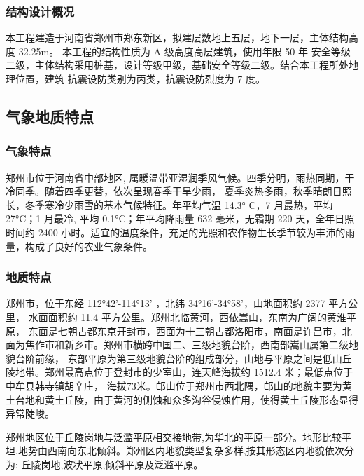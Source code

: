 \subsubsection{结构设计概况}

本工程建造于河南省郑州市郑东新区，拟建层数地上五层，地下一层，主体结构高度 32.25m。
本工程的结构性质为 A 级高度高层建筑，使用年限 50 年
安全等级二级，主体结构采用桩基，设计等级甲级，基础安全等级二级。结合本工程所处地理位置，建筑
抗震设防类别为丙类，抗震设防烈度为 7 度。

\subsection{气象地质特点}
\subsubsection{气象特点}

郑州市位于河南省中部地区, 属暖温带亚湿润季风气候。四季分明，雨热同期，干冷同季。随着四季更替，依次呈现春季干旱少雨，
夏季炎热多雨，秋季晴朗日照长，冬季寒冷少雨雪的基本气候特征。年平均气温 14.3° C，7 月最热，平均 27°C；1 月最冷,
平均 0.1°C；年平均降雨量 632 毫米，无霜期 220 天，全年日照时间约 2400 小时。适宜的温度条件，充足的光照和农作物生长季节较为丰沛的雨量，构成了良好的农业气象条件。

\subsubsection{地质特点}

郑州市，位于东经 112°42'-114°13' ，北纬 34°16'-34°58'，山地面积约 2377 平方公里， 水面面积约 11.4 平方公里。郑州北临黄河，西依嵩山，东南为广阔的黄淮平原，
东面是七朝古都东京开封市，西面为十三朝古都洛阳市，南面是许昌市，北面为焦作市和新乡市。郑州市横跨中国二、三级地貌台阶，西南部嵩山属第二级地貌台阶前缘，
东部平原为第三级地貌台阶的组成部分，山地与平原之间是低山丘陵地带。郑州最高点位于登封市的少室山，连天峰海拔约 1512.4 米；最低点位于中牟县韩寺镇胡辛庄，
海拔73米。邙山位于郑州市西北隅，邙山的地貌主要为黄土台地和黄土丘陵，由于黄河的侧蚀和众多沟谷侵蚀作用，使得黄土丘陵形态显得异常陡峻。

郑州地区位于丘陵岗地与泛滥平原相交接地带,为华北的平原一部分。地形比较平坦,地势由西南向东北倾斜。郑州区内地貌类型复杂多样,按其形态区内地貌依次分为:
丘陵岗地,波状平原,倾斜平原及泛滥平原。